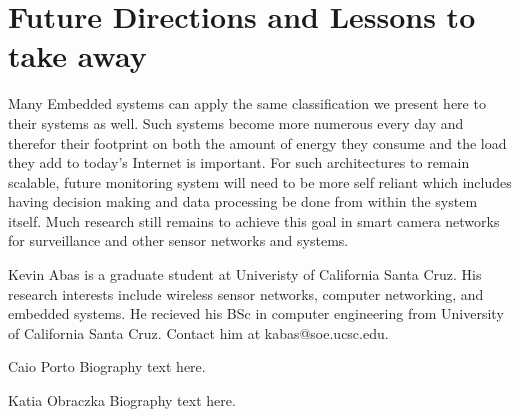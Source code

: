 \documentclass[journal,transmag]{IEEEtran}
\begin{document}
\section{Future Directions and Lessons to take away}
Many Embedded systems can apply the same classification we present here to their systems as well. Such systems become more numerous every day and therefor their
footprint on both the amount of energy they consume and the load they add to today's Internet is important. For such architectures to remain scalable,
future monitoring system will need to be more self reliant which includes having decision making and data processing be done from within the system itself.
Much research still remains to achieve this goal in smart camera networks for surveillance and other sensor networks and systems.








{}




\begin{IEEEbiographynophoto}{Kevin Abas}
is a graduate student at Univeristy of California Santa Cruz. His research
interests include wireless sensor networks, computer networking, and embedded
systems. He recieved his BSc in computer engineering from University of
California Santa Cruz. Contact him at kabas@soe.ucsc.edu.
\end{IEEEbiographynophoto}

\begin{IEEEbiographynophoto}{Caio Porto}
Biography text here.
\end{IEEEbiographynophoto}

\begin{IEEEbiographynophoto}{Katia Obraczka}
Biography text here.
\end{IEEEbiographynophoto}
\end{document}
